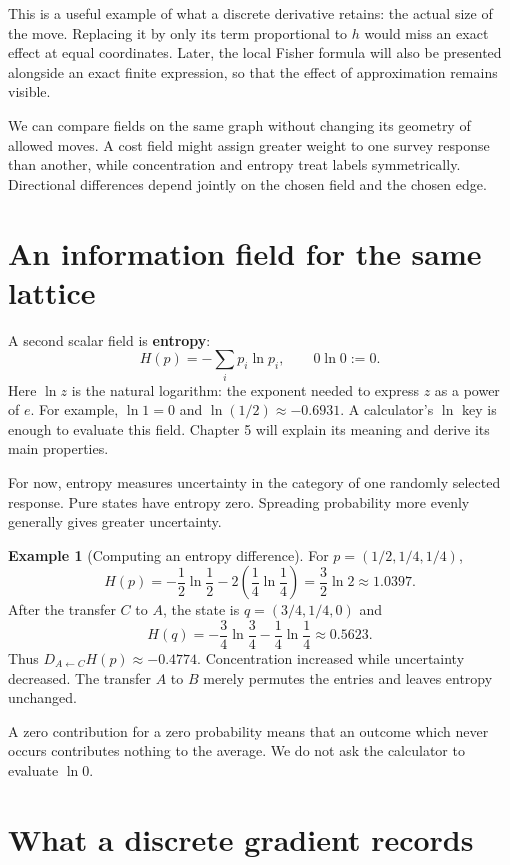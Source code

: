 \documentclass[11pt,oneside,openany]{book}
\theoremstyle{definition}
\newtheorem{example}{Example}[chapter]
\theoremstyle{remark}
\numberwithin{equation}{chapter}
\begin{document}
This is a useful example of what a discrete derivative retains: the actual size of the move. Replacing it by only its term proportional to \(h\) would miss an exact effect at equal coordinates. Later, the local Fisher formula will also be presented alongside an exact finite expression, so that the effect of approximation remains visible.

We can compare fields on the same graph without changing its geometry of allowed moves. A cost field might assign greater weight to one survey response than another, while concentration and entropy treat labels symmetrically. Directional differences depend jointly on the chosen field and the chosen edge.

\section{An information field for the same lattice}\label{ch03-an-information-field-for-the-same-lattice}

A second scalar field is \textbf{entropy}: \[H(p)=-\sum_i p_i\ln p_i,\qquad 0\ln0:=0.\] Here \(\ln z\) is the natural logarithm: the exponent needed to express \(z\) as a power of \(e\). For example, \(\ln1=0\) and \(\ln(1/2)\approx-0.6931\). A calculator's \(\ln\) key is enough to evaluate this field. Chapter 5 will explain its meaning and derive its main properties.

For now, entropy measures uncertainty in the category of one randomly selected response. Pure states have entropy zero. Spreading probability more evenly generally gives greater uncertainty.

\begin{example}[Computing an entropy difference]

For \(p=(1/2,1/4,1/4)\), \[H(p)=-\frac12\ln\frac12-2\left(\frac14\ln\frac14\right)
=\frac32\ln2\approx1.0397.\] After the transfer \(C\) to \(A\), the state is \(q=(3/4,1/4,0)\) and \[H(q)=-\frac34\ln\frac34-\frac14\ln\frac14\approx0.5623.\] Thus \(D_{A\leftarrow C}H(p)\approx-0.4774\). Concentration increased while uncertainty decreased. The transfer \(A\) to \(B\) merely permutes the entries and leaves entropy unchanged.

\end{example}

A zero contribution for a zero probability means that an outcome which never occurs contributes nothing to the average. We do not ask the calculator to evaluate \(\ln0\).

\section{What a discrete gradient records}\label{ch03-what-a-discrete-gradient-records}
\end{document}
